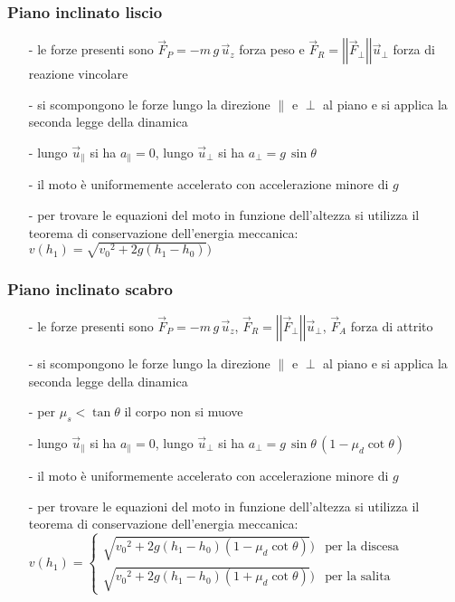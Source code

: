 \documentclass[a4paper]{article}
\newcommand\uz{\vec{u}_z}
\newcommand\uper{\vec{u}_\perp}
\newcommand\upar{\vec{u}_\parallel}
\newcommand\vmod[1]{\left|\left|{#1}\right|\right|}
\begin{document}
\subsubsection*{Piano inclinato liscio}
\begin{itemize}[topsep=3pt, itemsep=0pt]
	\item[-] le forze presenti sono \(\vec{F}_P = -m \, g \, \uz\) forza peso e \(\vec{F}_R = \vmod{\vec{F}_\perp} \uper\) forza di reazione vincolare
	\item[-] si scompongono le forze lungo la direzione \(\parallel\) e \(\perp\) al piano e si applica la seconda legge della dinamica
	\item[-] lungo \(\upar\) si ha \(a_\parallel = 0\), lungo \(\uper\) si ha \(a_\perp = g \, \sin \theta\)
	\item[-] il moto è uniformemente accelerato con accelerazione minore di \(g\)
	\item[-] per trovare le equazioni del moto in funzione dell'altezza si utilizza il teorema di conservazione dell'energia meccanica:
	\(v(h_1) = \sqrt{{v_0}^2 + 2g(h_1 - h_0)})\)
\end{itemize}

\subsubsection*{Piano inclinato scabro}
\begin{itemize}[topsep=3pt, itemsep=0pt]
	\item[-] le forze presenti sono \(\vec{F}_P = -m \, g \, \uz\), \(\vec{F}_R = \vmod{\vec{F}_\perp} \uper\), \(\vec{F}_A\) forza di attrito
	\item[-] si scompongono le forze lungo la direzione \(\parallel\) e \(\perp\) al piano e si applica la seconda legge della dinamica
	\item[-] per \(\mu_s < \tan \theta\) il corpo non si muove
	\item[-] lungo \(\upar\) si ha \(a_\parallel = 0\), lungo \(\uper\) si ha \(a_\perp = g \, \sin \theta \, (1-\mu_d \cot \theta)\)
	\item[-] il moto è uniformemente accelerato con accelerazione minore di \(g\)
	\item[-] per trovare le equazioni del moto in funzione dell'altezza si utilizza il teorema di conservazione dell'energia meccanica:
	\(v(h_1) = \begin{cases}
		\sqrt{{v_0}^2 + 2g(h_1 - h_0)(1-\mu_d \cot \theta)}) &\text{per la discesa} \\
		\sqrt{{v_0}^2 + 2g(h_1 - h_0)(1+\mu_d \cot \theta)}) &\text{per la salita}
	\end{cases}\)
\end{itemize}
\end{document}
